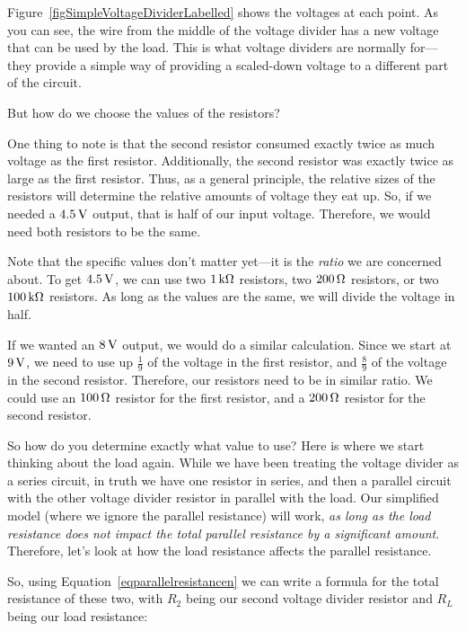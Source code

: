 
Figure~\ref{figSimpleVoltageDividerLabelled} shows the voltages at each point.
As you can see, the wire from the middle of the voltage divider has a new voltage that can be used by the load.
This is what voltage dividers are normally for---they provide a simple way of providing a scaled-down voltage to a different part of the circuit.

But how do we choose the values of the resistors?

One thing to note is that the second resistor consumed exactly twice as much voltage as the first resistor.
Additionally, the second resistor was exactly twice as large as the first resistor.
Thus, as a general principle, the relative sizes of the resistors will determine the relative amounts of voltage they eat up.
So, if we needed a $4.5\,\si{\volt}$ output, that is half of our input voltage.
Therefore, we would need both resistors to be the same.

Note that the specific values don't matter yet---it is the \emph{ratio} we are concerned about.
To get $4.5\,\si{\volt}$, we can use two $1\,\si{\kilo\ohm}$ resistors, two $200\,\si{\ohm}$ resistors, or two $100\,\si{\kilo\ohm}$ resistors.
As long as the values are the same, we will divide the voltage in half.

If we wanted an $8\,\si{\volt}$ output, we would do a similar calculation.  
Since we start at $9\,\si{\volt}$, we need to use up $\frac{1}{9}$ of the voltage in the first resistor, and $\frac{8}{9}$ of the voltage in the second resistor.
Therefore, our resistors need to be in similar ratio.
We could use an $100\,\si{\ohm}$ resistor for the first resistor, and a $200\,\si{\ohm}$ resistor for the second resistor.

So how do you determine exactly what value to use?
Here is where we start thinking about the load again.
While we have been treating the voltage divider as a series circuit, in truth we have one resistor in series, and then a parallel circuit with the other voltage divider resistor in parallel with the load.
Our simplified model (where we ignore the parallel resistance) will work, \emph{as long as the load resistance does not impact the total parallel resistance by a significant amount}.
Therefore, let's look at how the load resistance affects the parallel resistance.

So, using Equation~\ref{eqparallelresistancen} we can write a formula for the total resistance of these two, with $R_2$ being our second voltage divider resistor and $R_L$ being our load resistance:

